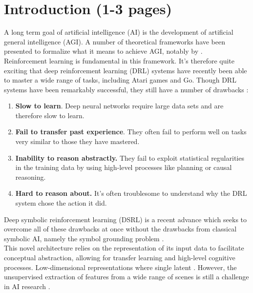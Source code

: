 \documentclass[12pt,twoside]{article}
\begin{document}


\tableofcontents
\newpage

 

\section{Introduction (1-3 pages)}
A long term goal of artificial intelligence (AI) is the development of artificial general intelligence (AGI). A number of theoretical frameworks have been presented to formalize what it means to achieve AGI, notably by \cite{Hutter2005}.\\

Reinforcement learning is fundamental in this framework. It's therefore quite exciting that deep reinforcement learning (DRL) systems have recently been able to master a wide range of tasks, including Atari games and Go. Though DRL systems have been remarkably successful, they still have a number of drawbacks \cite{Garnelo2016} \cite{Chollet2015}:

\begin{enumerate}
\item \textbf{Slow to learn}. Deep neural networks require large data sets and are therefore slow to learn.
\item \textbf{Fail to transfer past experience}. They often fail to perform well on tasks very similar to those they have mastered.
\item \textbf{Inability to reason abstractly.} They fail to exploit statistical regularities in the training data by using high-level processes like planning or causal reasoning.
\item \textbf{Hard to reason about.} It's often troublesome to understand why the DRL system chose the action it did.
\end{enumerate}

Deep symbolic reinforcement learning (DSRL) is a recent advance which seeks to overcome all of these drawbacks at once without the drawbacks from classical symbolic AI, namely the symbol grounding problem \cite{Garnelo2016}.\\

This novel architecture relies on the representation of its input data to facilitate conceptual abstraction, allowing for transfer learning and high-level cognitive processes. Low-dimensional representations where single latent \cite{Garnelo2016}. However, the unsupervised extraction of features from a wide range of scenes is still a challenge in AI research \cite{Bengio2013}.\\
\end{document}

